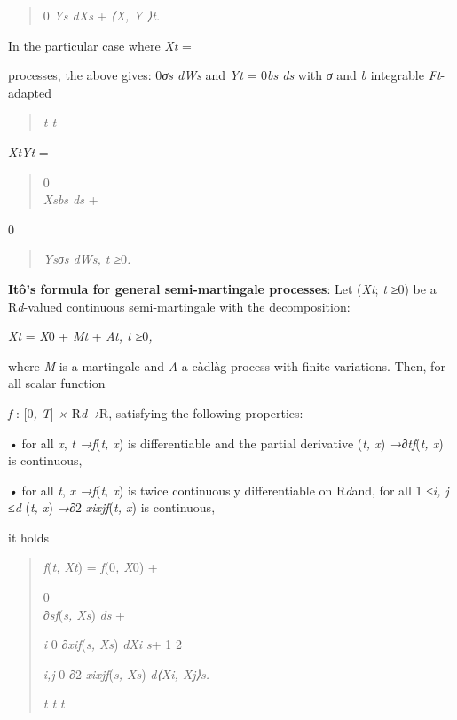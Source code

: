 \documentclass[
]{article}
\begin{document}
\begin{longtable}[]
\begin{minipage}[b]{\linewidth}
\begin{minipage}[b]{\linewidth}
{\begin{minipage}[b]{\linewidth}
\begin{quote}
0 \emph{Ys dXs} + \emph{⟨X, Y ⟩t.}
\end{quote}

In the particular case where \emph{Xt} =

processes, the above gives: 0\emph{σs dWs} and \emph{Yt} = 0\emph{bs ds}
with \emph{σ} and \emph{b} integrable \emph{Ft}-adapted

\begin{quote}
\emph{t t}
\end{quote}

\emph{XtYt} =

\begin{quote}
0\\
\emph{Xsbs ds} +
\end{quote}

0

\begin{quote}
\emph{Ysσs dWs, t ≥}0\emph{.}
\end{quote}

\textbf{Itô's formula for general semi-martingale processes}: Let
(\emph{Xt}; \emph{t ≥}0) be a R\emph{d}-valued continuous
semi-martingale with the decomposition:

\emph{Xt} = \emph{X}0 + \emph{Mt} + \emph{At, t ≥}0\emph{,}

where \emph{M} is a martingale and \emph{A} a càdlàg process with finite
variations. Then, for all scalar function

\emph{f} : {[}0\emph{, T}{]} \emph{×} R\emph{d→}R, satisfying the
following properties:

\emph{•} for all \emph{x}, \emph{t →f}(\emph{t, x}) is differentiable
and the partial derivative (\emph{t, x}) \emph{→∂tf}(\emph{t, x}) is
continuous,

\emph{•} for all \emph{t}, \emph{x →f}(\emph{t, x}) is twice
continuously differentiable on R\emph{d}and, for all 1 \emph{≤i, j ≤d}
(\emph{t, x}) \emph{→∂}2 \emph{xixjf}(\emph{t, x}) is continuous,

it holds

\begin{quote}
\emph{f}(\emph{t, Xt}) = \emph{f}(0\emph{, X}0) +

0\\
\emph{∂sf}(\emph{s, Xs}) \emph{ds} +

\emph{i} 0 \emph{∂xif}(\emph{s, Xs}) \emph{dXi s}+ 1 2

\emph{i,j} 0 \emph{∂}2 \emph{xixjf}(\emph{s, Xs}) \emph{d⟨Xi, Xj⟩s.}

\emph{t t} \emph{t}
\end{quote}


\end{minipage}}
\end{minipage}
\end{minipage}
\end{longtable}
\end{document}
